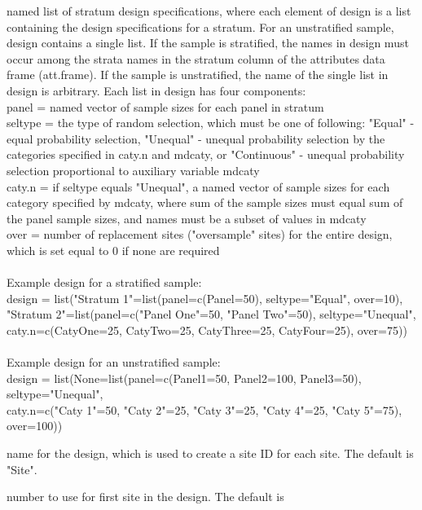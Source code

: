 \begin{Arguments}
\begin{ldescription}
\item[\code{design}] named list of stratum design specifications, where each element of
design is a list containing the design specifications for a stratum.  For
an unstratified sample, design contains a single list.  If the sample is
stratified, the names in design must occur among the strata names in the
stratum column of the attributes data frame (att.frame).  If the sample is
unstratified, the name of the single list in design is arbitrary.  Each
list in design has four components:\\
panel = named vector of sample sizes for each panel in stratum\\
seltype = the type of random selection, which must be one of following:
"Equal" - equal probability selection, "Unequal" - unequal probability
selection by the categories specified in caty.n and mdcaty, or
"Continuous" - unequal probability selection proportional to auxiliary
variable mdcaty\\
caty.n = if seltype equals "Unequal", a named vector of sample sizes for
each category specified by mdcaty, where sum of the sample sizes must
equal sum of the panel sample sizes, and names must be a subset of
values in mdcaty\\
over = number of replacement sites ("oversample" sites) for the entire
design, which is set equal to 0 if none are required\\\\
Example design for a stratified sample:\\
design = list("Stratum 1"=list(panel=c(Panel=50), seltype="Equal",
over=10),\\ "Stratum 2"=list(panel=c("Panel One"=50, "Panel Two"=50),
seltype="Unequal",\\ caty.n=c(CatyOne=25, CatyTwo=25, CatyThree=25,
CatyFour=25), over=75))\\\\
Example design for an unstratified sample:\\
design = list(None=list(panel=c(Panel1=50, Panel2=100, Panel3=50),
seltype="Unequal",\\ caty.n=c("Caty 1"=50, "Caty 2"=25, "Caty 3"=25,
"Caty 4"=25, "Caty 5"=75), over=100))\\
\item[\code{DesignID}] name for the design, which is used to create a site
ID for each site.  The default is "Site".
\item[\code{SiteBegin}] number to use for first site in the design.  The default is

\end{ldescription}
\end{Arguments}
